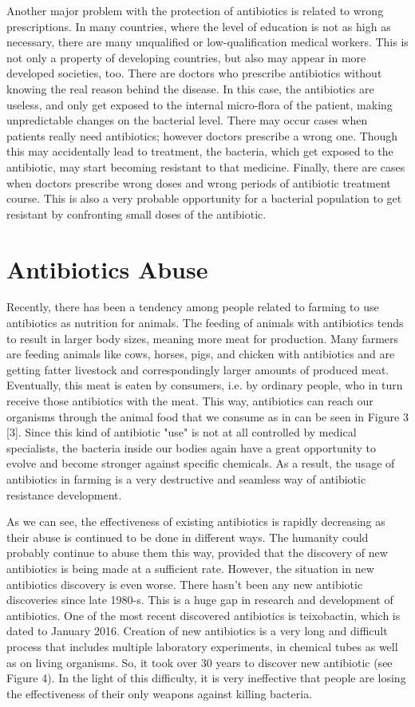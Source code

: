 Another major problem with the protection of antibiotics is related to wrong prescriptions. In many countries, where the level of education is not as high as necessary, there are many unqualified or low-qualification medical workers. This is not only a property of developing countries, but also may appear in more developed societies, too. There are doctors who prescribe antibiotics without knowing the real reason behind the disease. In this case, the antibiotics are useless, and only get exposed to the internal micro-flora of the patient, making unpredictable changes on the bacterial level. There may occur cases when patients really need antibiotics; however doctors prescribe a wrong one. Though this may accidentally lead to treatment, the bacteria, which get exposed to the antibiotic, may start becoming resistant to that medicine. Finally, there are cases when doctors prescribe wrong doses and wrong periods of antibiotic treatment course. This is also a very probable opportunity for a bacterial population to get resistant by confronting small doses of the antibiotic.

\section{Antibiotics Abuse}

Recently, there has been a tendency among people related to farming to use antibiotics as nutrition for animals. The feeding of animals with antibiotics tends to result in larger body sizes, meaning more meat for production. Many farmers are feeding animals like cows, horses, pigs, and chicken with antibiotics and are getting fatter livestock and correspondingly larger amounts of produced meat. Eventually, this meat is eaten by consumers, i.e. by ordinary people, who in turn receive those antibiotics with the meat. This way, antibiotics can reach our organisms through the animal food that we consume as in can be seen in Figure 3 [3]. Since this kind of antibiotic "use" is not at all controlled by medical specialists, the bacteria inside our bodies again have a great opportunity to evolve and become stronger against specific chemicals. As a result, the usage of antibiotics in farming is a very destructive and seamless way of antibiotic resistance development.

As we can see, the effectiveness of existing antibiotics is rapidly decreasing as their abuse is continued to be done in different ways. The humanity could probably continue to abuse them this way, provided that the discovery of new antibiotics is being made at a sufficient rate. However, the situation in new antibiotics discovery is even worse. There hasn't been any new antibiotic discoveries since late 1980-s. This is a huge gap in research and development of antibiotics. One of the most recent discovered antibiotics is teixobactin, which is dated to January 2016. Creation of new antibiotics is a very long and diﬃcult process that includes multiple laboratory experiments, in chemical tubes as well as on living organisms. So, it took over 30 years to discover new antibiotic (see Figure 4). In the light of this difficulty, it is very ineffective that people are losing the effectiveness of their only weapons against killing bacteria.

